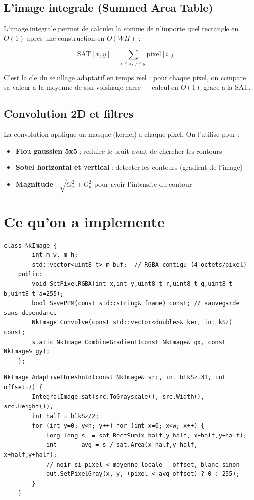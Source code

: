 \documentclass[12pt,a4paper]{report}
\begin{document}
\subsection*{L'image integrale (Summed Area Table)}

L'image integrale permet de calculer la somme de n'importe quel rectangle en $O(1)$ apres une construction en $O(WH)$ :

\[
\text{SAT}[x,y] = \sum_{i \leq x,\, j \leq y} \text{pixel}[i,j]
\]

C'est la cle du seuillage adaptatif en temps reel : pour chaque pixel, on compare sa valeur a la moyenne de son voisinage carre --- calcul en $O(1)$ grace a la SAT.

\subsection*{Convolution 2D et filtres}

La convolution applique un masque (kernel) a chaque pixel. On l'utilise pour :
\begin{itemize}
  \item \textbf{Flou gaussien 5x5} : reduire le bruit avant de chercher les contours
  \item \textbf{Sobel horizontal et vertical} : detecter les contours (gradient de l'image)
  \item \textbf{Magnitude} : $\sqrt{G_x^2 + G_y^2}$ pour avoir l'intensite du contour
\end{itemize}

\section{Ce qu'on a implemente}

\begin{lstlisting}[caption={NKImage.h : structure interne RGBA}]
    class NkImage {
        int m_w, m_h;
        std::vector<uint8_t> m_buf;  // RGBA contigu (4 octets/pixel)
    public:
        void SetPixelRGBA(int x,int y,uint8_t r,uint8_t g,uint8_t b,uint8_t a=255);
        bool SavePPM(const std::string& fname) const; // sauvegarde sans dependance
        NkImage Convolve(const std::vector<double>& ker, int kSz) const;
        static NkImage CombineGradient(const NkImage& gx, const NkImage& gy);
    };
\end{lstlisting}

\begin{lstlisting}[caption={AdaptiveThreshold : seuillage adaptatif via SAT}]
    NkImage AdaptiveThreshold(const NkImage& src, int blkSz=31, int offset=7) {
        IntegralImage sat(src.ToGrayscale(), src.Width(), src.Height());
        int half = blkSz/2;
        for (int y=0; y<h; y++) for (int x=0; x<w; x++) {
            long long s  = sat.RectSum(x-half,y-half, x+half,y+half);
            int       avg = s / sat.Area(x-half,y-half, x+half,y+half);
            // noir si pixel < moyenne locale - offset, blanc sinon
            out.SetPixelGray(x, y, (pixel < avg-offset) ? 0 : 255);
        }
    }
\end{lstlisting}
\end{document}
